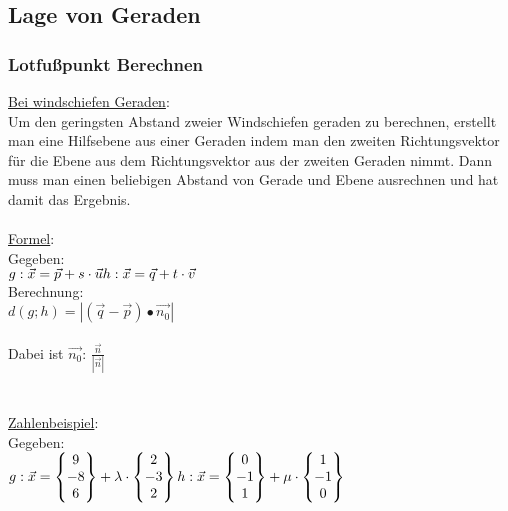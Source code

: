 \subsection{Lage von Geraden}
\subsubsection{Lotfußpunkt Berechnen}
\underline{Bei windschiefen Geraden}: \\
Um den geringsten Abstand zweier Windschiefen geraden zu berechnen, 
erstellt man eine Hilfsebene aus einer Geraden indem man den zweiten Richtungsvektor für die Ebene aus dem Richtungsvektor aus der zweiten Geraden nimmt. 
Dann muss man einen beliebigen Abstand von Gerade und Ebene ausrechnen und hat damit das Ergebnis.
\\\\
\underline{Formel}: \\
Gegeben: \\
$
g: \vec{x} = \vec{p} + s \cdot \vec{u} \\
h: \vec{x} = \vec{q} + t \cdot \vec{v}
$
\\
Berechnung: \\
$
d(g; h) = |(\vec{q} - \vec{p}) \bullet \vec{n_0}|
$
\\\\
Dabei ist $\vec{n_0}$: $\frac{\vec{n}}{|\vec{n}|}$
\\\\\\
\underline{Zahlenbeispiel}: \\
Gegeben: \\
$
g: \vec{x} = 
\begin{Bmatrix}
    9 \\ -8 \\ 6
\end{Bmatrix}
+ \lambda \cdot
\begin{Bmatrix}
    2 \\ -3 \\ 2
\end{Bmatrix} 
\\
h: \vec{x} = 
\begin{Bmatrix}
    0 \\ -1 \\ 1
\end{Bmatrix}
+ \mu \cdot 
\begin{Bmatrix}
    1 \\ -1 \\ 0
\end{Bmatrix}
$
\\
